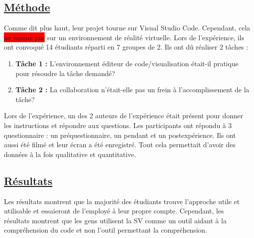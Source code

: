 \documentclass[a4paper,10pt, oneside]{article}
\newcommand{\red}{\colorbox{red}}
\begin{document}
\subsection{\ul{Méthode}}
        \par Comme dit plus haut, leur projet tourne sur Visual Studio Code. Cependant, cela \red{ne tourne pas} sur un environnement de réalité virtuelle. Lors de l'expérience,
        ils ont convoqué 14 étudiants réparti en 7 groupes de 2. Ils ont dû réaliser 2 tâches :
        \begin{enumerate}
            \item \textbf{Tâche 1 :} L'environnement éditeur de code/visualisation était-il pratique pour résoudre la tâche demandé?
            \item \textbf{Tâche 2 :} La collaboration n'était-elle pas un frein à l'accomplissement de la tâche?
        \end{enumerate}
        \par Lors de l'expérience, un des 2 auteurs de l'expérience était présent pour donner les instructions et répondre aux questions. Les participants ont répondu à 3 questionnaire : un préquestionnaire, un pendant et un postexpérience. Ils ont aussi été filmé et leur écran a été enregistré.
        Tout cela permettait d'avoir des données à la fois qualitative et quantitative.
\subsection{\ul{Résultats}}
    \par Les résultats montrent que la majorité des étudiants trouve l'approche utile et utilisable et essaieront de l'employé à leur propre compte. Cependant, les résultats montrent que
    les gens utilisent la SV comme un outil aidant à la compréhension du code et non l'outil permettant la compréhension.
\newpage


\end{document}
